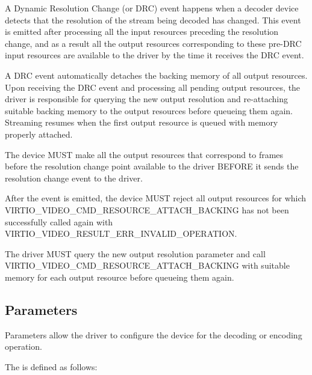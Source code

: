 A Dynamic Resolution Change (or DRC) event happens when a decoder device
detects that the resolution of the stream being decoded has changed.
This event is emitted after processing all the input resources preceding
the resolution change, and as a result all the output resources
corresponding to these pre-DRC input resources are available to the
driver by the time it receives the DRC event.

A DRC event automatically detaches the backing memory of all output
resources. Upon receiving the DRC event and processing all pending
output resources, the driver is responsible for querying the new output
resolution and re-attaching suitable backing memory to the output
resources before queueing them again. Streaming resumes when the first
output resource is queued with memory properly attached.


The device MUST make all the output resources that correspond to frames
before the resolution change point available to the driver BEFORE it
sends the resolution change event to the driver.

After the event is emitted, the device MUST reject all output resources
for which VIRTIO_VIDEO_CMD_RESOURCE_ATTACH_BACKING has not been
successfully called again with
VIRTIO_VIDEO_RESULT_ERR_INVALID_OPERATION.


The driver MUST query the new output resolution parameter and call
VIRTIO_VIDEO_CMD_RESOURCE_ATTACH_BACKING with suitable memory for
each output resource before queueing them again.

\subsection{Parameters}\label{sec:Device Types / Video Device / Parameters}

Parameters allow the driver to configure the device for the decoding or
encoding operation.

The  is defined as follows:

